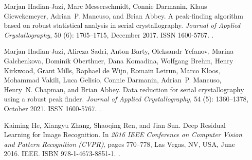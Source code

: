 \documentclass[a4paper]{article}
\begin{document}
\begin{thebibliography}{33}
Marjan {Hadian-Jazi}, Marc Messerschmidt, Connie Darmanin, Klaus Giewekemeyer,
  Adrian~P. Mancuso, and Brian Abbey.
\newblock A peak-finding algorithm based on robust statistical analysis in
  serial crystallography.
\newblock \emph{Journal of Applied Crystallography}, 50 (6):
  1705--1715, December 2017.
\newblock ISSN 1600-5767.
\newblock {}.

Marjan {Hadian-Jazi}, Alireza Sadri, Anton Barty, Oleksandr Yefanov, Marina
  Galchenkova, Dominik Oberthuer, Dana Komadina, Wolfgang Brehm, Henry
  Kirkwood, Grant Mills, Raphael {de Wijn}, Romain Letrun, Marco Kloos,
  Mohammad Vakili, Luca Gelisio, Connie Darmanin, Adrian~P. Mancuso, Henry~N.
  Chapman, and Brian Abbey.
\newblock Data reduction for serial crystallography using a robust peak finder.
\newblock \emph{Journal of Applied Crystallography}, 54 (5):
  1360--1378, October 2021.
\newblock ISSN 1600-5767.
\newblock {}.

Kaiming He, Xiangyu Zhang, Shaoqing Ren, and Jian Sun.
\newblock Deep {{Residual Learning}} for {{Image Recognition}}.
\newblock In \emph{2016 {{IEEE Conference}} on {{Computer Vision}} and
  {{Pattern Recognition}} ({{CVPR}})}, pages 770--778, {Las Vegas, NV, USA},
  June 2016. {IEEE}.
\newblock ISBN 978-1-4673-8851-1.
\newblock {}.


\end{thebibliography}
\end{document}
